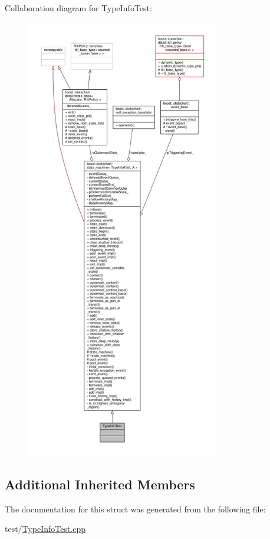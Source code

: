 Collaboration diagram for Type\+Info\+Test\+:
\nopagebreak
\begin{figure}[H]
\begin{center}
\leavevmode
\includegraphics[height=550pt]{struct_type_info_test__coll__graph}
\end{center}
\end{figure}
\subsection*{Additional Inherited Members}


The documentation for this struct was generated from the following file\+:\begin{DoxyCompactItemize}
\item 
test/\mbox{\hyperlink{_type_info_test_8cpp}{Type\+Info\+Test.\+cpp}}\end{DoxyCompactItemize}
